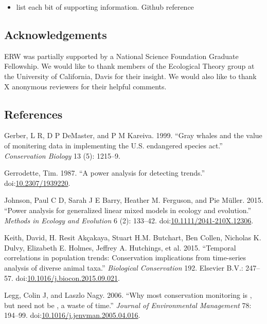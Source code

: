 \documentclass[11pt,]{article}
\providecommand{\tightlist}{%
  \setlength{\itemsep}{0pt}\setlength{\parskip}{0pt}}
\begin{document}
\begin{itemize}
\tightlist
\item
  list each bit of supporting information. Github reference
\end{itemize}

\subsection{Acknowledgements}\label{acknowledgements}

ERW was partially supported by a National Science Foundation Graduate
Fellowship. We would like to thank members of the Ecological Theory
group at the University of California, Davis for their insight. We would
also like to thank X anonymous reviewers for their helpful comments.

\subsection*{References}\label{references}

\hypertarget{refs}{}
\hypertarget{ref-Gerber1999}{}
Gerber, L R, D P DeMaster, and P M Kareiva. 1999. ``Gray whales and the
value of monitering data in implementing the U.S. endangered species
act.'' \emph{Conservation Biology} 13 (5): 1215--9.

\hypertarget{ref-Gerrodette1987}{}
Gerrodette, Tim. 1987. ``A power analysis for detecting trends.''
doi:\href{https://doi.org/10.2307/1939220}{10.2307/1939220}.

\hypertarget{ref-Johnson2015}{}
Johnson, Paul C D, Sarah J E Barry, Heather M. Ferguson, and Pie Müller.
2015. ``Power analysis for generalized linear mixed models in ecology
and evolution.'' \emph{Methods in Ecology and Evolution} 6 (2): 133--42.
doi:\href{https://doi.org/10.1111/2041-210X.12306}{10.1111/2041-210X.12306}.

\hypertarget{ref-Keith2015}{}
Keith, David, H. Resit Akçakaya, Stuart H.M. Butchart, Ben Collen,
Nicholas K. Dulvy, Elizabeth E. Holmes, Jeffrey A. Hutchings, et al.
2015. ``Temporal correlations in population trends: Conservation
implications from time-series analysis of diverse animal taxa.''
\emph{Biological Conservation} 192. Elsevier B.V.: 247--57.
doi:\href{https://doi.org/10.1016/j.biocon.2015.09.021}{10.1016/j.biocon.2015.09.021}.

\hypertarget{ref-Legg2006}{}
Legg, Colin J, and Laszlo Nagy. 2006. ``Why most conservation monitoring
is , but need not be , a waste of time.'' \emph{Journal of Environmental
Management} 78: 194--99.
doi:\href{https://doi.org/10.1016/j.jenvman.2005.04.016}{10.1016/j.jenvman.2005.04.016}.
\end{document}
